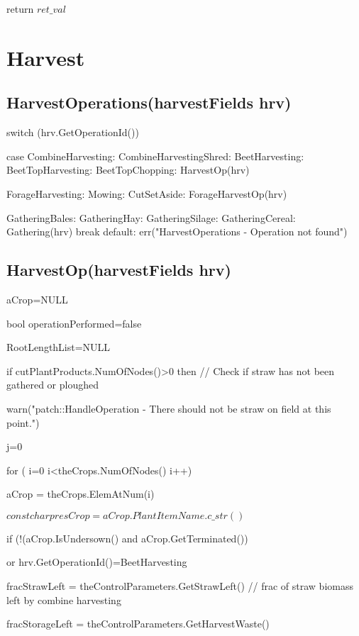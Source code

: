 \documentclass[%
]{scrartcl}
\begin{document}
{{{   return $ret\_val$


\section{Harvest}

\subsection{HarvestOperations(harvestFields   hrv)
}	switch (hrv.GetOperationId())
   
	case  CombineHarvesting:     
  CombineHarvestingShred:
       BeetHarvesting:
     	BeetTopHarvesting:
       BeetTopChopping: HarvestOp(hrv)
			      
     ForageHarvesting:
    Mowing:
       CutSetAside:
      			ForageHarvestOp(hrv)
      			
      GatheringBales:
      GatheringHay:
      GatheringSilage:
     GatheringCereal:
      			Gathering(hrv)
      			break
      default:
      err("HarvestOperations - Operation not found")



\subsection{HarvestOp(harvestFields    hrv)}

    aCrop=NULL

   bool operationPerformed=false
     
      RootLengthList=NULL
   
   if cutPlantProducts.NumOfNodes()>0 then       // Check if straw has not been gathered or ploughed

  \quad   warn("patch::HandleOperation - There should not be straw on field at this point.")

    j=0

   for ( i=0 i<theCrops.NumOfNodes() i++)
   
      aCrop = theCrops.ElemAtNum(i)

      $const char   presCrop = aCrop.PlantItemName.c\_str()$

      if (!(aCrop.IsUndersown()  and  aCrop.GetTerminated()) 

or hrv.GetOperationId()=BeetHarvesting
     
           fracStrawLeft   = theControlParameters.GetStrawLeft()  
// frac of straw biomass left by combine harvesting
         
  fracStorageLeft = theControlParameters.GetHarvestWaste()  

}}}
\end{document}
